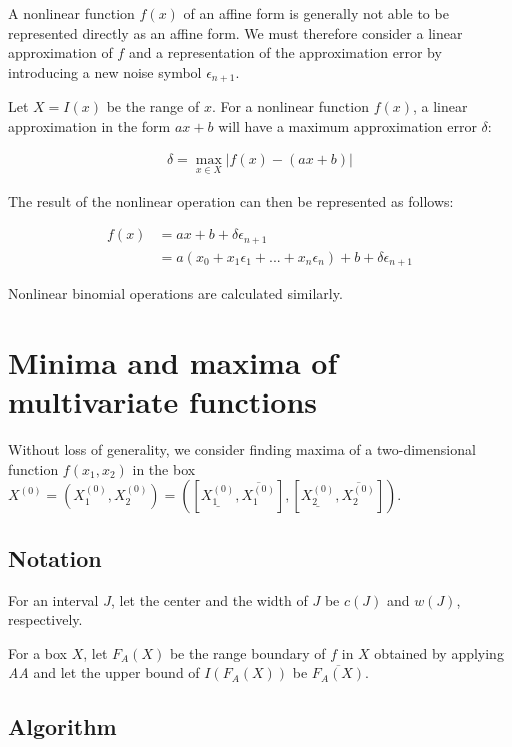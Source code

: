 \documentclass[12pt]{scrartcl} %
\begin{document}
A nonlinear function $f(x)$ of an affine form is generally not able to be represented directly as an affine form. We must therefore consider a linear approximation of $f$ and a representation of the approximation error by introducing a new noise symbol $\epsilon_{n+1}$.

Let $X = I(x)$ be the range of $x$. For a nonlinear function $f(x)$, a linear approximation in the form $ax + b$ will have a maximum approximation error $\delta$:

\begin{align}
    \delta = \max_{x \in X} | f(x) - (ax + b) |
\end{align}

The result of the nonlinear operation can then be represented as follows:

\begin{align}
    f(x) &= ax + b + \delta \epsilon_{n+1}\\
         &= a(x_0 + x_1 \epsilon_1 + ... + x_n \epsilon_n) + b + \delta \epsilon_{n+1}
\end{align}

Nonlinear binomial operations are calculated similarly.

\section{Minima and maxima of multivariate functions}


Without loss of generality, we consider finding maxima of a two-dimensional function $f(x_1, x_2)$ in the box $X^{(0)} = (X_1^{(0)}, X_2^{(0)}) = ([\underline{X_1^{(0)}}, \overline{X_1^{(0)}}], [\underline{X_2^{(0)}}, \overline{X_2^{(0)}}])$.

\subsection{Notation}

For an interval $J$, let the center and the width of $J$ be $c(J)$ and $w(J)$, respectively.

For a box $X$, let $F_A(X)$ be the range boundary of $f$ in $X$ obtained by applying \emph{AA} and let the upper bound of $I(F_A(X))$ be $\overline{F_A(X)}$.

\subsection{Algorithm}
\end{document}
